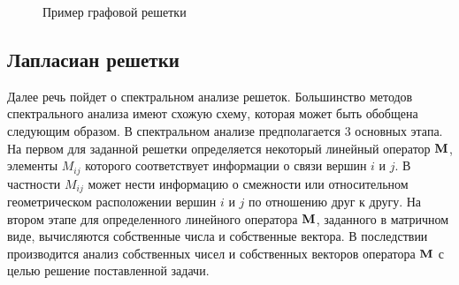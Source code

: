 \begin{figure}[!htb]
\caption{Пример графовой решетки}
\end{figure}

\subsection{Лапласиан решетки}

Далее речь пойдет о спектральном анализе решеток. Большинство методов спектрального анализа имеют схожую схему, которая может быть обобщена следующим образом. В спектральном анализе предполагается $3$ основных этапа. На первом для заданной решетки определяется некоторый линейный оператор $\textbf{M}$, элементы $M_{ij}$ которого соответствует информации о связи вершин $i$ и $j$. В частности $M_{ij}$ может нести информацию о смежности или относительном геометрическом расположении вершин $i$ и $j$ по отношению друг к другу. На втором этапе для определенного линейного оператора $\textbf{M}$, заданного в матричном виде, вычисляются собственные числа и собственные вектора. В последствии производится анализ собственных чисел и собственных векторов оператора $\textbf{M}$ с целью решение поставленной задачи.

